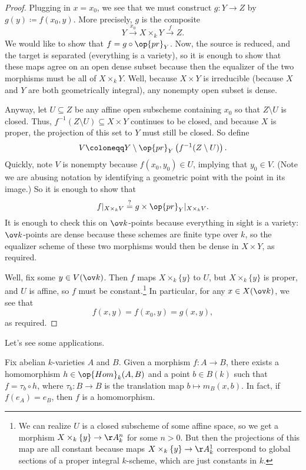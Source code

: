 \documentclass[../notes.tex]{subfiles}
\begin{document}
\begin{proof}
	Plugging in $x=x_0$, we see that we must construct $g\colon Y\to Z$ by $g(y)\coloneqq f(x_0,y)$. More precisely, $g$ is the composite
	\[Y\stackrel{x_0}\to X\times_k Y\stackrel f\to Z.\]
	We would like to show that $f=g\circ\op{pr}_Y$. Now, the source is reduced, and the target is separated (everything is a variety), so it is enough to show that these maps agree on an open dense subset because then the equalizer of the two morphisms must be all of $X\times_k Y$. Well, because $X\times Y$ is irreducible (because $X$ and $Y$ are both geometrically integral), any nonempty open subset is dense.

	Anyway, let $U\subseteq Z$ be any affine open subscheme containing $x_0$ so that $Z\setminus U$ is closed. Thus, $f^{-1}(Z\setminus U)\subseteq X\times Y$ continues to be closed, and because $X$ is proper, the projection of this set to $Y$ must still be closed. So define
	\[V\coloneqq Y\setminus\op{pr}_Y\left(f^{-1}(Z\setminus U)\right).\]
	Quickly, note $V$ is nonempty because $f(x_0,y_0)\in U$, implying that $y_0\in V$. (Note we are abusing notation by identifying a geometric point with the point in its image.) So it is enough to show that
	\[f|_{X\times_k V}\stackrel?=g\times{\op{pr}_Y}|_{X\times_k V}.\]
	It is enough to check this on $\ov k$-points because everything in sight is a variety: $\ov k$-points are dense because these schemes are finite type over $k$, so the equalizer scheme of these two morphisms would then be dense in $X\times Y$, as required.

	Well, fix some $y\in V(\ov k)$. Then $f$ maps $X\times_k\{y\}$ to $U$, but $X\times_k\{y\}$ is proper, and $U$ is affine, so $f$ must be constant.\footnote{We can realize $U$ is a closed subscheme of some affine space, so we get a morphism $X\times_k\{y\}\to\AA^n_k$ for some $n>0$. But then the projections of this map are all constant because maps $X\times_k\{y\}\to\AA^1_k$ correspond to global sections of a proper integral $k$-scheme, which are just constants in $k$.} In particular, for any $x\in X(\ov k)$, we see that
	\[f(x,y)=f(x_0,y)=g(x,y),\]
	as required.
\end{proof}
Let's see some applications.
\begin{corollary} \label{cor:trans-hom}
	Fix abelian $k$-varieties $A$ and $B$. Given a morphism $f\colon A\to B$, there exists a homomorphism $h\in\op{Hom}_k(A,B)$ and a point $b\in B(k)$ such that $f=\tau_b\circ h$, where $\tau_b\colon B\to B$ is the translation map $b\mapsto m_B(x,b)$. In fact, if $f(e_A)=e_B$, then $f$ is a homomorphism.
\end{corollary}
\end{document}
